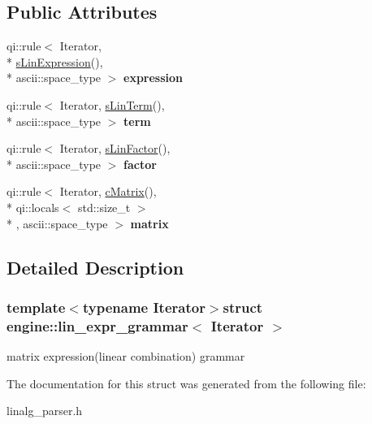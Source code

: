 \subsection*{Public Attributes}
\begin{DoxyCompactItemize}
\item 
\hypertarget{structengine_1_1lin__expr__grammar_a98cc7da17406b244975cb74b45ff9cb3}{qi\-::rule$<$ Iterator, \\*
\hyperlink{structengine_1_1sLinExpression}{s\-Lin\-Expression}(), \\*
ascii\-::space\-\_\-type $>$ {\bfseries expression}}\label{structengine_1_1lin__expr__grammar_a98cc7da17406b244975cb74b45ff9cb3}

\item 
\hypertarget{structengine_1_1lin__expr__grammar_a24be954b2688602d2111b8bb59a03911}{qi\-::rule$<$ Iterator, \hyperlink{structengine_1_1sLinTerm}{s\-Lin\-Term}(), \\*
ascii\-::space\-\_\-type $>$ {\bfseries term}}\label{structengine_1_1lin__expr__grammar_a24be954b2688602d2111b8bb59a03911}

\item 
\hypertarget{structengine_1_1lin__expr__grammar_ad7e2838134c41692b123d13c8a63ae02}{qi\-::rule$<$ Iterator, \hyperlink{structengine_1_1sLinFactor}{s\-Lin\-Factor}(), \\*
ascii\-::space\-\_\-type $>$ {\bfseries factor}}\label{structengine_1_1lin__expr__grammar_ad7e2838134c41692b123d13c8a63ae02}

\item 
\hypertarget{structengine_1_1lin__expr__grammar_abc4bb74d2dec8bc2014d31ee04249995}{qi\-::rule$<$ Iterator, \hyperlink{structengine_1_1cMatrix}{c\-Matrix}(), \\*
qi\-::locals$<$ std\-::size\-\_\-t $>$\\*
, ascii\-::space\-\_\-type $>$ {\bfseries matrix}}\label{structengine_1_1lin__expr__grammar_abc4bb74d2dec8bc2014d31ee04249995}

\end{DoxyCompactItemize}


\subsection{Detailed Description}
\subsubsection*{template$<$typename Iterator$>$struct engine\-::lin\-\_\-expr\-\_\-grammar$<$ Iterator $>$}

matrix expression(linear combination) grammar 

The documentation for this struct was generated from the following file\-:\begin{DoxyCompactItemize}
\item 
linalg\-\_\-parser.\-h\end{DoxyCompactItemize}

